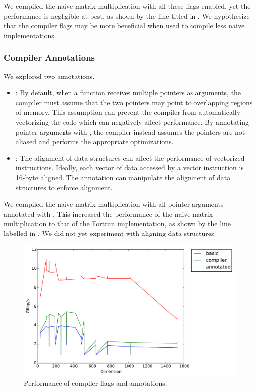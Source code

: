 We compiled the naive matrix multiplication with all these \icc{} flags
enabled, yet the performance is negligible at best, as shown by the line titled
 in . We hypothesize that the compiler flags may
be more beneficial when used to compile less naive implementations.

\subsubsection{Compiler Annotations}
We explored two \icc{} annotations.
\begin{itemize}
  \item {}:
    By default, when a function receives multiple pointers as arguments, the
    compiler must assume that the two pointers may point to overlapping regions
    of memory. This assumption can prevent the compiler from automatically
    vectorizing the code which can negatively affect performance. By annotating
    pointer arguments with , the compiler instead assumes the
    pointers are not aliased and performs the appropriate optimizations.

  \item {}:
    The alignment of data structures can affect the performance of vectorized
    instructions. Ideally, each vector of data accessed by a vector instruction
    is 16-byte aligned. The  annotation can manipulate the
    alignment of data structures to enforce alignment.
\end{itemize}

We compiled the naive matrix multiplication with all pointer arguments
annotated with . This increased the performance of the naive
matrix multiplication to that of the Fortran implementation, as shown by the
line labelled  in . We did not yet experiment
with aligning data structures.

\begin{figure}[h]
  \centering
  \includegraphics[width=\textwidth]{img/timing_compiler.pdf}
  \caption{Performance of compiler flags and annotations.}
  \label{fig:compiler}
\end{figure}
